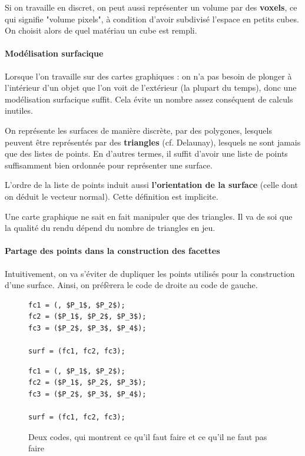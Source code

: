 \documentclass[a4paper, 10pt]{article}
\begin{document}
Si on travaille en discret, on peut aussi représenter un volume par des
\textbf{voxels}, ce qui signifie "volume pixels", à condition d'avoir subdivisé
l'espace en petits cubes. On choisit alors de quel matériau un cube est rempli.

\paragraph{Modélisation surfacique}
Lorsque l'on travaille sur des cartes graphiques : on n'a pas besoin de plonger
à l'intérieur d'un objet que l'on voit de l'extérieur (la plupart du temps),
donc une modélisation surfacique suffit. Cela évite un nombre assez conséquent
de calculs inutiles.

On représente les surfaces de manière discrète, par des polygones, lesquels
peuvent être représentés par des \textbf{triangles} (cf. Delaunay), lesquels 
ne sont jamais que des listes de points. En d'autres termes, il suffit d'avoir 
une liste de points suffisamment bien ordonnée pour représenter une surface.

L'ordre de la liste de points induit aussi \textbf{l'orientation de la surface} 
(celle dont on déduit le vecteur normal). Cette définition est implicite.

Une carte graphique ne sait en fait manipuler que des triangles.
Il va de soi que la qualité du rendu dépend du nombre de triangles en jeu.

\paragraph{Partage des points dans la construction des facettes}
Intuitivement, on va s'éviter de dupliquer les points utilisés pour la 
construction d'une surface. Ainsi, on préfèrera le code de droite au code
de gauche.

\begin{figure}
\begin{lrbox}{\codeone}
\begin{minipage}{0.5\columnwidth}
\begin{lstlisting}
fc1 = (, $P_1$, $P_2$);
fc2 = ($P_1$, $P_2$, $P_3$);
fc3 = ($P_2$, $P_3$, $P_4$);

surf = (fc1, fc2, fc3);

\end{lstlisting}
\end{minipage}
\end{lrbox}

\begin{lrbox}{\codetwo}
\begin{minipage}{0.5\columnwidth}
\begin{lstlisting}
fc1 = (, $P_1$, $P_2$);
fc2 = ($P_1$, $P_2$, $P_3$);
fc3 = ($P_2$, $P_3$, $P_4$);

surf = (fc1, fc2, fc3);
\end{lstlisting}
\end{minipage}
\end{lrbox}

{\usebox\codeone}
{\usebox\codetwo}


\caption{Deux codes, qui montrent ce qu'il faut faire et ce qu'il ne faut
    pas faire}
\end{figure}
\end{document}
